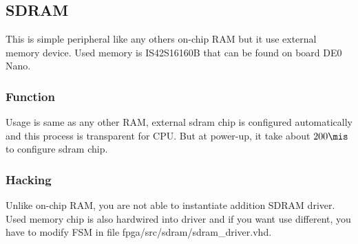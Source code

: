 \subsection{SDRAM}

This is simple peripheral like any others on-chip RAM but it use 
external memory device. Used memory is IS42S16160B that can be found on 
board DE0 Nano.

\subsubsection{Function}

Usage is same as any other RAM, external sdram chip is configured 
automatically and this process is transparent for CPU. But at power-up, 
it take about $200 \mis$ to configure sdram chip.

\subsubsection{Hacking}

Unlike on-chip RAM, you are not able to instantiate addition SDRAM driver. 
Used memory chip is also hardwired into driver and if you want use 
different, you have to modify FSM in file 
fpga/src/sdram/sdram_driver.vhd.
